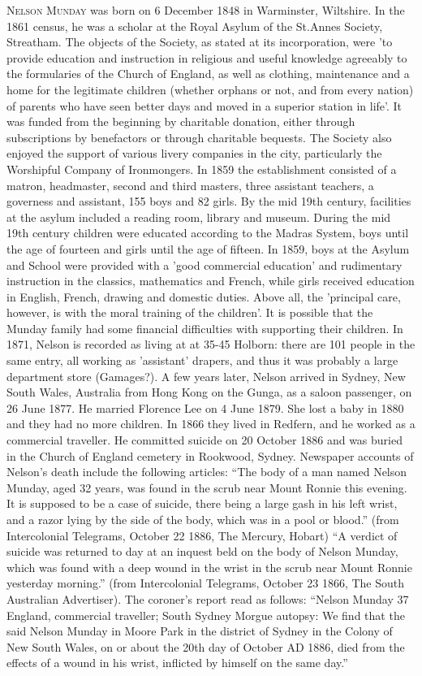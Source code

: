 {\textsc{Nelson Munday} was born on 6 December 1848 in	Warminster, Wiltshire. In the 1861 census, he was a scholar at the Royal Asylum of the St.Annes Society, Streatham. The objects of the Society, as stated at its incorporation, were 'to provide education and instruction in religious and useful knowledge agreeably to the formularies of the Church of England, as well as clothing, maintenance and a home for the legitimate children (whether orphans or not, and from every nation) of parents who have seen better days and moved in a superior station in life'. It was funded from the beginning by charitable donation, either through subscriptions by benefactors or through charitable bequests. The Society also enjoyed the support of various livery companies in the city, particularly the Worshipful Company of Ironmongers. In 1859 the establishment consisted of a matron, headmaster, second and third masters, three assistant teachers, a governess and assistant, 155 boys and 82 girls. By the mid 19th century, facilities at the asylum included a reading room, library and museum. During the mid 19th century children were educated according to the Madras System, boys until the age of fourteen and girls until the age of fifteen. In 1859, boys at the Asylum and School were provided with a 'good commercial education' and rudimentary instruction in the classics, mathematics and French, while girls received education in English, French, drawing and domestic duties. Above all, the 'principal care, however, is with the moral training of the children'. It is possible that the Munday family had some financial difficulties with supporting their children.
In 1871, Nelson is recorded as living at at 35-45 Holborn: there are 101 people in the same entry, all working as 'assistant' drapers, and thus it was probably a large department store (Gamages?). A few years later, Nelson arrived in Sydney, New South Wales, Australia from Hong Kong on the Gunga, as a saloon passenger, on 26 June 1877. He married Florence Lee on 4 June 1879. She lost a baby in 1880 and they had no more children. In 1866 they lived in Redfern, and he worked as a commercial traveller.  He committed suicide on 20 October 1886 and was buried in the Church of England cemetery in Rookwood, Sydney.
Newspaper accounts of Nelson's death include the following articles: 
  ``The body of a man named Nelson Munday, aged 32 years, was found in the scrub near Mount Ronnie this evening. It is supposed to be a case of suicide, there being a large gash in his left wrist, and a razor lying by the side of the body, which was in a pool or blood.'' (from Intercolonial Telegrams, October 22 1886, The Mercury, Hobart) 
 ``A verdict of suicide was returned to day at an inquest beld on the body of Nelson Munday, which was found with a deep wound in the wrist in the scrub near Mount Ronnie yesterday morning.'' (from Intercolonial Telegrams, October 23 1866, The South Australian Advertiser). The coroner's report read as follows: 
``Nelson Munday 37 England, commercial traveller; South Sydney Morgue autopsy:
We find that the said Nelson Munday in Moore Park in the district of Sydney in the Colony of New South Wales, on or about the 20th day of October AD 1886, died from the effects of a wound in his wrist, inflicted by himself on the same day.''

}
